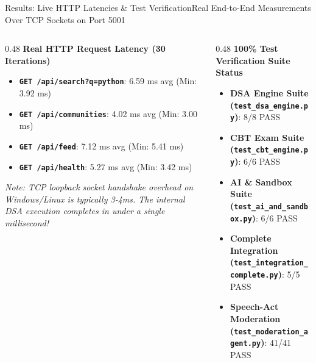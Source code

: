 \documentclass[aspectratio=169,10pt]{beamer}
\begin{document}
\begin{frame}[t]{Results: Live HTTP Latencies \& Test Verification}{Real End-to-End Measurements Over TCP Sockets on Port 5001}
  \begin{columns}[t]
    \begin{column}{0.48\textwidth}
      {\fontsize{9.0}{11.0}\selectfont\textbf{\textcolor{KoinexaRed}{Real HTTP Request Latency (30 Iterations)}}}\par\vspace{1.5pt}
      \begin{itemize}\setlength{\itemsep}{2.0pt}
        \item {\fontsize{8.0}{9.8}\selectfont \textbf{\texttt{GET /api/search?q=python}}: 6.59 ms avg (Min: 3.92 ms)}
        \item {\fontsize{8.0}{9.8}\selectfont \textbf{\texttt{GET /api/communities}}: 4.02 ms avg (Min: 3.00 ms)}
        \item {\fontsize{8.0}{9.8}\selectfont \textbf{\texttt{GET /api/feed}}: 7.12 ms avg (Min: 5.41 ms)}
        \item {\fontsize{8.0}{9.8}\selectfont \textbf{\texttt{GET /api/health}}: 5.27 ms avg (Min: 3.42 ms)}
      \end{itemize}
      \vspace{0.15cm}
      {\fontsize{7.5}{9.5}\selectfont\textit{\textcolor{KoinexaGray}{Note: TCP loopback socket handshake overhead on Windows/Linux is typically 3-4ms. The internal DSA execution completes in under a single millisecond!}}}
    \end{column}
    \begin{column}{0.48\textwidth}
      {\fontsize{9.0}{11.0}\selectfont\textbf{\textcolor{KoinexaOrange}{100\% Test Verification Suite Status}}}\par\vspace{1.5pt}
      \begin{itemize}\setlength{\itemsep}{2.0pt}
        \item {\fontsize{8.0}{9.8}\selectfont \textbf{DSA Engine Suite (\texttt{test\_dsa\_engine.py})}: 8/8 PASS}
        \item {\fontsize{8.0}{9.8}\selectfont \textbf{CBT Exam Suite (\texttt{test\_cbt\_engine.py})}: 6/6 PASS}
        \item {\fontsize{8.0}{9.8}\selectfont \textbf{AI \& Sandbox Suite (\texttt{test\_ai\_and\_sandbox.py})}: 6/6 PASS}
        \item {\fontsize{8.0}{9.8}\selectfont \textbf{Complete Integration (\texttt{test\_integration\_complete.py})}: 5/5 PASS}
        \item {\fontsize{8.0}{9.8}\selectfont \textbf{Speech-Act Moderation (\texttt{test\_moderation\_agent.py})}: 41/41 PASS}
      \end{itemize}
    \end{column}
  \end{columns}
\end{frame}
\end{document}
